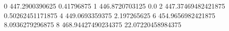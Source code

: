 0 447.2900390625 0.41796875
1 446.8720703125 0.0
2 447.37469482421875 0.50262451171875
4 449.0693359375 2.197265625
6 454.9656982421875 8.0936279296875
8 468.94427490234375 22.07220458984375
